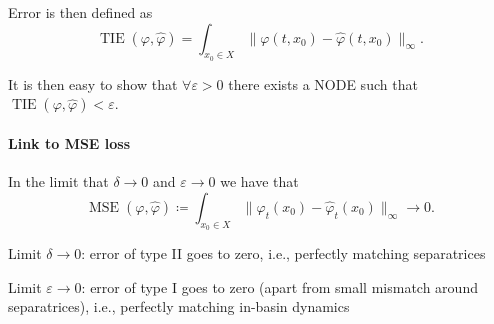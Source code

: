 \documentclass{article}
\newcounter{ct}
\begin{document}
Error is then defined as 
\begin{equation}
\operatorname{TIE}(\varphi, \hat{\varphi}) = \int_{x_0\in X}\|\varphi(t,x_0) - \hat{\varphi}(t, x_0)\|_\infty.
\end{equation}

It is then easy to show that $\forall\varepsilon>0$ there exists a NODE such that $\operatorname{TIE}(\varphi, \hat{\varphi})<\varepsilon$.

\paragraph{Link to MSE loss}
In the limit that $\delta\rightarrow 0$ and $\varepsilon\rightarrow 0$  we have that 
\[\operatorname{MSE}(\varphi, \hat{\varphi}) \coloneqq \int_{x_0\in X} \|\varphi_t(x_0) - \hat{\varphi}_t(x_0)\|_\infty \rightarrow 0.\]


Limit $\delta\rightarrow 0$: error of type II goes to zero, i.e., perfectly matching separatrices


Limit $\varepsilon\rightarrow 0$: error of type I goes to zero (apart from small mismatch around separatrices), i.e., perfectly matching in-basin dynamics
\end{document}
